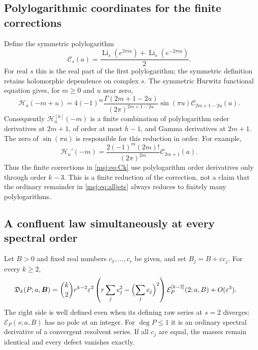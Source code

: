 \subsection{Polylogarithmic coordinates for the finite corrections}

Define the symmetric polylogarithm
\[
 \mathcal C_s(a)=\frac{\operatorname{Li}_s(e^{2\pi ia})
                          +\operatorname{Li}_s(e^{-2\pi ia})}{2}.
\]
For real $s$ this is the real part of the first polylogarithm; the
symmetric definition retains holomorphic dependence on complex $s$.
The symmetric Hurwitz functional equation gives, for $m\ge0$ and
$u$ near zero,
\begin{equation}
 \mathcal H_a(-m+u)
 =4(-1)^m\frac{\Gamma(2m+1-2u)}{(2\pi)^{2m+1-2u}}
                  \sin(\pi u)\mathcal C_{2m+1-2u}(a).
 \label{msj:eq:H-polylog}
\end{equation}
Consequently $\mathcal H_a^{[h]}(-m)$ is a finite combination of
polylogarithm order derivatives at $2m+1$, of order at most $h-1$,
and Gamma derivatives at $2m+1$. The zero of $\sin(\pi u)$ is
responsible for this reduction in order. For example,
\begin{equation}
 \mathcal H_a'(-m)=
 \frac{2(-1)^m(2m)!}{(2\pi)^{2m}}\mathcal C_{2m+1}(a).
 \label{msj:eq:Hprime-polylog}
\end{equation}
Thus the finite corrections in \eqref{msj:eq:Ck} use polylogarithm
order derivatives only through order $k-3$. This is a finite reduction
of the correction, not a claim that the ordinary remainder in
\eqref{msj:eq:alljets} always reduces to finitely many polylogarithms.

\subsection{A confluent law simultaneously at every spectral order}

\begin{theorem}
\label{msj:thm:allconfluent}
Let $B>0$ and fixed real numbers $c_1,\ldots,c_r$ be given, and set
$B_j=B+\varepsilon c_j$. For every $k\ge2$,
\begin{align}
 \mathfrak D_k(P;a,\boldsymbol B)
 &=\binom{k}{2}r^{k-2}\varepsilon^2
       \left(r\sum_jc_j^2-\Bigl(\sum_jc_j\Bigr)^2\right)
                    \mathcal E_P^{[k-2]}(2;a,B)
       +O(\varepsilon^3).
 \label{msj:eq:allconfluence}
\end{align}
The right side is well defined even when its defining raw series at
$s=2$ diverges: $\mathcal E_P(s;a,B)$ has no pole at an integer.
For $\deg P\le1$ it is an ordinary spectral derivative of a convergent
resolvent series. If all $c_j$ are equal, the masses remain identical
and every defect vanishes exactly.
\end{theorem}

